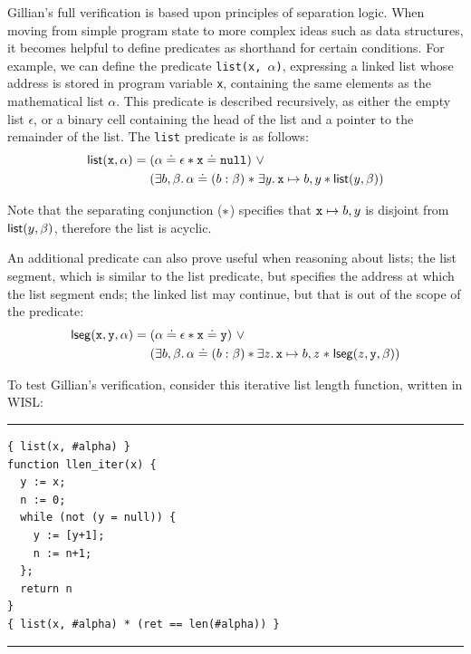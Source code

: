Gillian's full verification is based upon principles of separation logic. When
moving from simple program state to more complex ideas such as data structures,
it becomes helpful to define predicates as shorthand for certain conditions.
For example, we can define the predicate \texttt{list(x, $\alpha$)}, expressing
a linked list whose address is stored in program variable \texttt{x},
containing the same elements as the mathematical list $\alpha$. This predicate
is described recursively, as either the empty list $\epsilon$, or a binary cell
containing the head of the list and a pointer to the remainder of the list. The
\texttt{list} predicate is as follows:
\begin{align*}
  \mathsf{list}(\mathtt{x}, \alpha) =\; &(\alpha \doteq \epsilon \ast \mathtt{x} \doteq \mathtt{null})~\lor\\
  & (\exists b, \beta \ldotp \alpha \doteq (b : \beta) \mathrel{*} \exists y \ldotp \mathtt{x} \mapsto b, y \ast \mathsf{list}(y, \beta))
\end{align*}

Note that the separating conjunction ($\mathrel{*}$) specifies that
$\mathtt{x} \mapsto b, y$ is disjoint from $\mathsf{list}(y, \beta)$, therefore the
list is acyclic.

An additional predicate can also prove useful when reasoning about lists; the
list segment, which is similar to the list predicate, but specifies the address
at which the list segment ends; the linked list may continue, but that is out
of the scope of the predicate:
\begin{align*}
  \mathsf{lseg}(\mathtt{x}, \mathtt{y}, \alpha) =\; &(\alpha \doteq \epsilon \ast \mathtt{x} \doteq \mathtt{y})~\lor\\
  &(\exists b, \beta \ldotp \alpha \doteq (b : \beta) \ast \exists z \ldotp \mathtt{x} \mapsto b, z \mathrel{*} \mathsf{lseg}(z, \mathtt{y}, \beta))
\end{align*}

To test Gillian's verification, consider this iterative list length function,
written in WISL:\@

\begin{listing}[!ht]
\noindent\rule{\textwidth}{0.5pt}
\vspace{-0.6cm}
\begin{verbatim}
{ list(x, #alpha) }
function llen_iter(x) {
  y := x;
  n := 0;
  while (not (y = null)) {
    y := [y+1];
    n := n+1;
  };
  return n
}
{ list(x, #alpha) * (ret == len(#alpha)) }
\end{verbatim}
\vspace{-0.4cm}
\noindent\rule{\textwidth}{0.5pt}
\vspace{-0.6cm}
\caption{Verification example - list length in WISL}
\end{listing}

